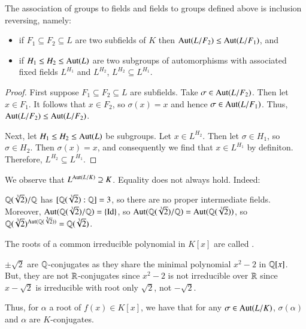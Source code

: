 \documentclass[12pt, a4paper, oneside, openright, titlepage]{book}
\begin{document}
\begin{prop}
    The association of groups to fields and fields to groups defined above is inclusion reversing, namely: \begin{itemize}
        \item if $F_1\subseteq F_2\subseteq L$ are two subfields of $K$ then $\operatorname{Aut}(L/F_2) \leq \operatorname{Aut}(L/F_1)$, and
        \item if $H_1 \leq H_2 \leq \operatorname{Aut}(L)$ are two subgroups of automorphisms with associated fixed fields $L^{H_1}$ and $L^{H_2}$, $L^{H_2} \subseteq L^{H_1}$.
    \end{itemize}
\end{prop}
\begin{proof}
    First suppose $F_1 \subseteq F_2 \subseteq L$ are subfields. Take $\sigma \in \operatorname{Aut}(L/F_2)$. Then let $x \in F_1$. It follows that $x \in F_2$, so $\sigma(x) = x$ and hence $\sigma \in \operatorname{Aut}(L/F_1)$. Thus, $\operatorname{Aut}(L/F_2) \leq \operatorname{Aut}(L/F_2)$.

    Next, let $H_1 \leq H_2 \leq \operatorname{Aut}(L)$ be subgroups. Let $x \in L^{H_2}$. Then let $\sigma \in H_1$, so $\sigma \in H_2$. Then $\sigma(x) = x$, and consequently we find that $x \in L^{H_1}$ by definiton. Therefore, $L^{H_2} \subseteq L^{H_1}$.
\end{proof}

We observe that $L^{\operatorname{Aut}(L/K)} \supseteq K$. Equality does not always hold. Indeed:

\begin{eg}
    $\mathbb Q(\sqrt[3]{2})/\mathbb Q$ has $[\mathbb Q(\sqrt[3]{2}):\mathbb Q] = 3$, so there are no proper intermediate fields. Moreover, $\operatorname{Aut}(\mathbb Q(\sqrt[3]{2})/\mathbb Q) = \{\operatorname{Id}\}$, so $\operatorname{Aut}(\mathbb Q(\sqrt[3]{2})/\mathbb Q) = \operatorname{Aut}(\mathbb Q(\sqrt[3]{2}))$, so $\mathbb Q(\sqrt[3]{2})^{\operatorname{Aut}(\mathbb Q(\sqrt[3]{2}))} = \mathbb Q(\sqrt[3]{2})$.
\end{eg}

\begin{defn}
    The roots of a common irreducible polynomial in $K[x]$ are called .
\end{defn}

\begin{eg}
    $\pm\sqrt{2}$ are $\mathbb Q$-conjugates as they share the minimal polynomial $x^2 - 2$ in $\mathbb Q[x]$. But, they are not $\mathbb R$-conjugates since $x^2-2$ is not irreducible over $\mathbb R$ since $x - \sqrt{2}$ is irreducible with root only $\sqrt{2}$, not $-\sqrt{2}$.
\end{eg}

Thus, for $\alpha$ a root of $f(x) \in K[x]$, we have that for any $\sigma \in \operatorname{Aut}(L/K)$, $\sigma(\alpha)$ and $\alpha$ are $K$-conjugates.
\end{document}
